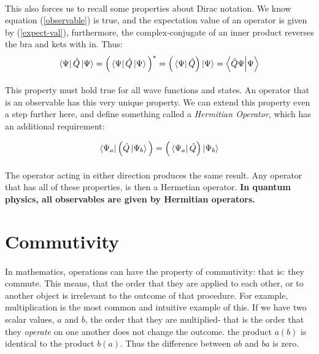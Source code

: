 \documentclass[12pt,letterpaper]{book}
\begin{document}
\paragraph*{}This also forces us to recall some properties about Dirac notation. We know equation (\ref{observable}) is true, and the expectation value of an operator is given by (\ref{expect-val}), furthermore, the complex-conjugate of an inner product reverses the bra and kets with in. Thus:
\begin{equation}
\bra{\Psi}\hat{Q}\ket{\Psi} = 
\Big(\bra{\Psi}\hat{Q}\ket{\Psi}\Big)^* = 
\Big(\bra{\Psi}\hat{Q}\Big)\ket{\Psi} = 
\bra{\hat{Q}\Psi}\ket{\Psi}
\end{equation}

\paragraph*{}This property must hold true for all wave functions and states. An operator that is an observable has this very unique property. We can extend this property even a step further here, and define something called a \textit{Hermitian Operator}, which has an additional requirement:

\begin{equation}
\bra{\Psi_a}\Big(\hat{Q}\ket{\Psi_b}\Big) = 
\Big(\bra{\Psi_a}\hat{Q}\Big)\ket{\Psi_b}
\end{equation}

\paragraph*{}The operator acting in either direction produces the same result. Any operator that has all of these properties, is then a Hermetian operator. \textbf{In quantum physics, all observables are given by Hermitian operators.}


\section{Commutivity}

\paragraph*{}In mathematics, operations can have the property of commutivity: that is: they commute. This means, that the order that they are applied to each other, or to another object is irrelevant to the outcome of that procedure. For example, multiplication is the most common and intuitive example of this. If we have two scalar values, $a$ and $b$, the order that they are multiplied- that is the order that they \textit{operate} on one another does not change the outcome. the product $a(b)$ is identical to the product $b(a)$. Thus the difference between $ab$ and $ba$ is zero.
\end{document}
